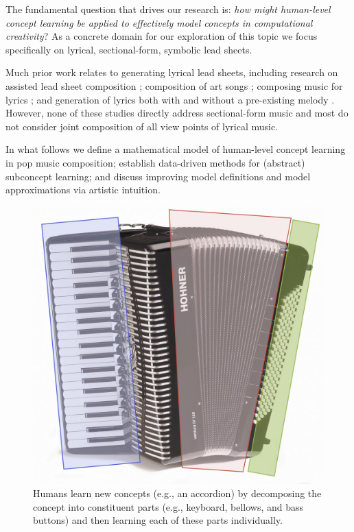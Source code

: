 \documentclass[letterpaper]{article}
\begin{document}
The fundamental question that drives our research is: \emph{how might human-level concept learning be applied to effectively model concepts in computational creativity}? As a concrete domain for our exploration of this topic we focus specifically on lyrical, sectional-form, symbolic lead sheets.

Much prior work relates to generating lyrical lead sheets, including research on assisted lead sheet composition \cite{papadopoulos2016assisted}; composition of art songs \cite{toivanen2013automatical}; composing music for lyrics \cite{scirea2015smug,monteith2012automatic}; and generation of lyrics both with \cite{ramakrishnan2009automatic} and without a pre-existing melody \cite{gonccalo2015tra}. However, none of these studies directly address sectional-form music and most do not consider joint composition of all view points of lyrical music.

In what follows we define a mathematical model of human-level concept learning in pop music composition; establish data-driven methods for (abstract) subconcept learning; and discuss improving model definitions and model approximations via artistic intuition.

\begin{figure}[th]
	\centering
	\includegraphics[width=.6\linewidth]{accordion}
	\caption{\label{fig:accordion} Humans learn new concepts (e.g., an accordion) by decomposing the concept into constituent parts (e.g., keyboard, bellows, and bass buttons) and then learning each of these parts individually.}
\end{figure}
\end{document}
